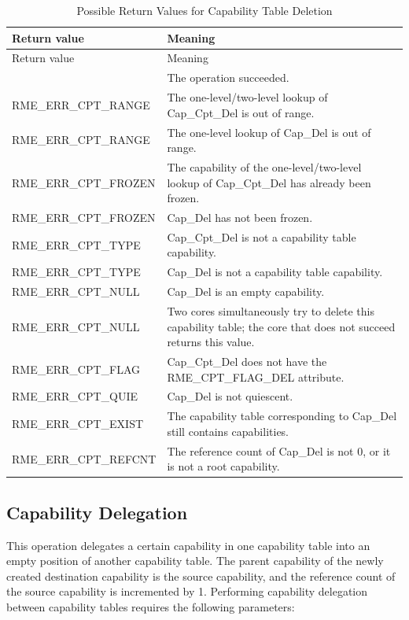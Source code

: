 \begin{xltabular}{\textwidth}{@{}>{\hsize\raggedright\arraybackslash}X>{\hsize\raggedright\arraybackslash}X@{}}
\caption{Possible Return Values for Capability Table Deletion}\label{tab:2-8-delete-capability-table-return-values}\\
\toprule
Return value & Meaning\tabularnewline
\endfirsthead
\toprule
Return value & Meaning\tabularnewline
\midrule
\endhead
\bottomrule
{} & The operation succeeded.\tabularnewline
    RME\_ERR\_CPT\_RANGE & The one-level/two-level lookup of Cap\_Cpt\_Del is out of range.\tabularnewline
    RME\_ERR\_CPT\_RANGE & The one-level lookup of Cap\_Del is out of range.\tabularnewline
    RME\_ERR\_CPT\_FROZEN & The capability of the one-level/two-level lookup of Cap\_Cpt\_Del has already been frozen.\tabularnewline
    RME\_ERR\_CPT\_FROZEN & Cap\_Del has not been frozen.\tabularnewline
    RME\_ERR\_CPT\_TYPE & Cap\_Cpt\_Del is not a capability table capability.\tabularnewline
    RME\_ERR\_CPT\_TYPE & Cap\_Del is not a capability table capability.\tabularnewline
    RME\_ERR\_CPT\_NULL & Cap\_Del is an empty capability.\tabularnewline
    RME\_ERR\_CPT\_NULL & Two cores simultaneously try to delete this capability table; the core that does not succeed returns this value.\tabularnewline
    RME\_ERR\_CPT\_FLAG & Cap\_Cpt\_Del does not have the RME\_CPT\_FLAG\_DEL attribute.\tabularnewline
    RME\_ERR\_CPT\_QUIE & Cap\_Del is not quiescent.\tabularnewline
    RME\_ERR\_CPT\_EXIST & The capability table corresponding to Cap\_Del still contains capabilities.\tabularnewline
    RME\_ERR\_CPT\_REFCNT & The reference count of Cap\_Del is not 0, or it is not a root capability.\tabularnewline
\end{xltabular}
\nopagebreak[4]

\subsection{Capability Delegation}\label{subsec:2-transfer-a-capability}

This operation delegates a certain capability in one capability table into an empty position of another capability table. The parent capability of the newly created destination capability is the source capability, and the reference count of the source capability is incremented by 1. Performing capability delegation between capability tables requires the following parameters:

